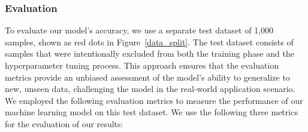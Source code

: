 \documentclass[gmd, manuscript]{copernicus}
\begin{document}
\subsubsection{Evaluation}
To evaluate our model's accuracy, we use a separate test dataset of 1,000 samples, shown as red dots in Figure~\ref{data_split}. The test dataset consists of samples that were intentionally excluded from both the training phase and the hyperparameter tuning process. This approach ensures that the evaluation metrics provide an unbiased assessment of the model's ability to generalize to new, unseen data, challenging the model in the real-world application scenario. We employed the following evaluation metrics to measure the performance of our machine learning model on this test dataset. %
We use the following three metrics for the evaluation of our results:
\end{document}
